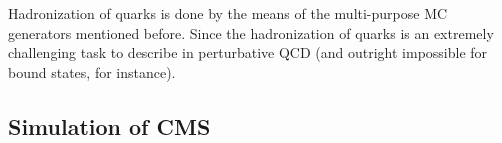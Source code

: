 Hadronization of quarks is done by the means of the multi-purpose MC generators mentioned before. Since the hadronization of quarks is an extremely challenging task to describe
in perturbative QCD (and outright impossible for bound states, for instance).


\subsection{Simulation of CMS}
\label{sub:geant}
